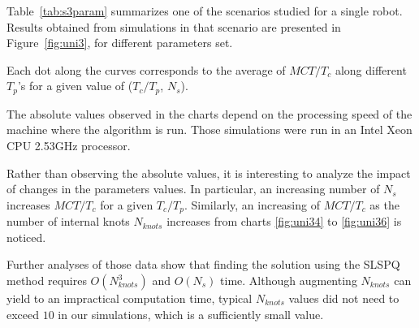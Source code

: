 
Table~\ref{tab:s3param} summarizes one of the scenarios studied for a 
single robot. Results obtained from simulations in 
that scenario are presented in Figure~\ref{fig:uni3}, for different parameters set.

Each dot along the curves corresponds to the average of $MCT/T_c$ along different $T_p$'s for a given value of ($T_c/T_p$, $N_s$).

The absolute values observed in the charts depend on the processing speed of the machine
where the algorithm is run. Those simulations were run in an Intel Xeon CPU 2.53GHz processor.

Rather than observing the absolute values, it is interesting to analyze the impact of 
changes in the parameters values. In particular, an increasing number of $N_s$ 
increases $MCT/T_c$ for a 
given $T_c/T_p$. Similarly, an increasing of $MCT/T_c$ as the number of
internal knots $N_{knots}$ increases from charts \ref{fig:uni34} to \ref{fig:uni36} is 
noticed.

Further analyses of those data show that finding the solution using the SLSPQ method
requires $O(N_{knots}^3)$ and $O(N_s)$ time. Although augmenting $N_{knots}$ can yield
to an impractical computation time, typical $N_{knots}$ values did not need to exceed $10$ in our simulations, which is a sufficiently small value.

